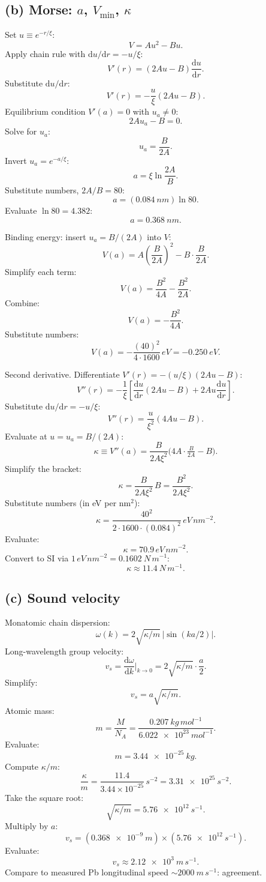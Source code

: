 \documentclass[11pt]{article}
\newcommand{\de}{\mathrm{d}}
\begin{document}
\subsection*{(b) Morse: $a$, $V_{\min}$, $\kappa$}

Set $u\equiv e^{-r/\xi}$:
\[
V = A u^2 - B u.
\]
Apply chain rule with $\de u/\de r = -u/\xi$:
\[
V'(r) = (2Au - B)\frac{\de u}{\de r}.
\]
Substitute $\de u/\de r$:
\[
V'(r) = -\frac{u}{\xi}(2A u - B).
\]
Equilibrium condition $V'(a)=0$ with $u_a\neq 0$:
\[
2A u_a - B = 0.
\]
Solve for $u_a$:
\[
u_a = \frac{B}{2A}.
\]
Invert $u_a = e^{-a/\xi}$:
\[
a = \xi\ln\frac{2A}{B}.
\]
Substitute numbers, $2A/B = 80$:
\[
a = (\SI{0.084}{nm})\ln 80.
\]
Evaluate $\ln 80 = 4.382$:
\[
\boxed{\;a = \SI{0.368}{nm}.\;}
\]

Binding energy: insert $u_a=B/(2A)$ into $V$:
\[
V(a) = A\left(\frac{B}{2A}\right)^2 - B\cdot\frac{B}{2A}.
\]
Simplify each term:
\[
V(a) = \frac{B^2}{4A} - \frac{B^2}{2A}.
\]
Combine:
\[
V(a) = -\frac{B^2}{4A}.
\]
Substitute numbers:
\[
\boxed{\;V(a) = -\frac{(40)^2}{4\cdot 1600}\,\si{eV} = \SI{-0.250}{eV}.\;}
\]

Second derivative. Differentiate $V'(r) = -(u/\xi)(2Au-B)$:
\[
V''(r) = -\frac{1}{\xi}\left[\frac{\de u}{\de r}(2Au-B) + 2Au\frac{\de u}{\de r}\right].
\]
Substitute $\de u/\de r=-u/\xi$:
\[
V''(r) = \frac{u}{\xi^2}(4Au - B).
\]
Evaluate at $u=u_a=B/(2A)$:
\[
\kappa \equiv V''(a) = \frac{B}{2A\xi^2}\bigl(4A\cdot\tfrac{B}{2A} - B\bigr).
\]
Simplify the bracket:
\[
\kappa = \frac{B}{2A\xi^2}\,B = \frac{B^2}{2A\xi^2}.
\]
Substitute numbers (in eV per nm$^2$):
\[
\kappa = \frac{40^2}{2\cdot 1600\cdot(0.084)^2}\,\si{eV\,nm^{-2}}.
\]
Evaluate:
\[
\kappa = 70.9\,\si{eV\,nm^{-2}}.
\]
Convert to SI via $1\,\si{eV\,nm^{-2}} = \SI{0.1602}{N\,m^{-1}}$:
\[
\boxed{\;\kappa \approx \SI{11.4}{N\,m^{-1}}.\;}
\]

\subsection*{(c) Sound velocity}

Monatomic chain dispersion:
\[
\omega(k) = 2\sqrt{\kappa/m}\,|\sin(ka/2)|.
\]
Long-wavelength group velocity:
\[
v_s = \frac{\de\omega}{\de k}\bigg|_{k\to 0} = 2\sqrt{\kappa/m}\cdot\frac{a}{2}.
\]
Simplify:
\[
v_s = a\sqrt{\kappa/m}.
\]
Atomic mass:
\[
m = \frac{M}{N_A} = \frac{\SI{0.207}{kg\,mol^{-1}}}{\SI{6.022e23}{mol^{-1}}}.
\]
Evaluate:
\[
m = \SI{3.44e-25}{kg}.
\]
Compute $\kappa/m$:
\[
\frac{\kappa}{m} = \frac{11.4}{3.44\times 10^{-25}}\,\si{s^{-2}} = \SI{3.31e25}{s^{-2}}.
\]
Take the square root:
\[
\sqrt{\kappa/m} = \SI{5.76e12}{s^{-1}}.
\]
Multiply by $a$:
\[
v_s = (\SI{0.368e-9}{m})\times(\SI{5.76e12}{s^{-1}}).
\]
Evaluate:
\[
\boxed{\;v_s \approx \SI{2.12e3}{m\,s^{-1}}.\;}
\]
Compare to measured Pb longitudinal speed $\sim\SI{2000}{m\,s^{-1}}$: agreement.
\end{document}
